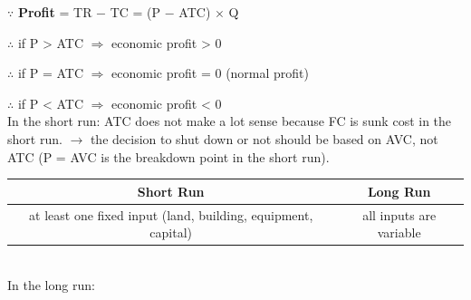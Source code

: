 \documentclass[UTF8]{article}
\begin{document}
\begin{figure}
\end{figure}

\newpage 

$\because$ \textbf{Profit} = TR $-$ TC = (P $-$ ATC) $\times$ Q 

$\therefore$ if P > ATC $\Longrightarrow$ economic profit > 0 

$\therefore$ if P = ATC $\Longrightarrow$ economic profit = 0 (normal profit)

$\therefore$ if P < ATC $\Longrightarrow$ economic profit < 0\\

In the short run: ATC does not make a lot sense because FC is sunk cost in the short run. $\longrightarrow$ the decision to shut down or not should be based on AVC, not ATC (P = AVC is the breakdown point in the short run).\\

\begin{tabular}{|c|c|}
\hline
\textbf{Short Run} & \textbf{Long Run} \\
\hline
at least one fixed input (land, building, equipment, capital) & all inputs are variable \\
\hline
\end{tabular}\\

In the long run: 
\end{document}
